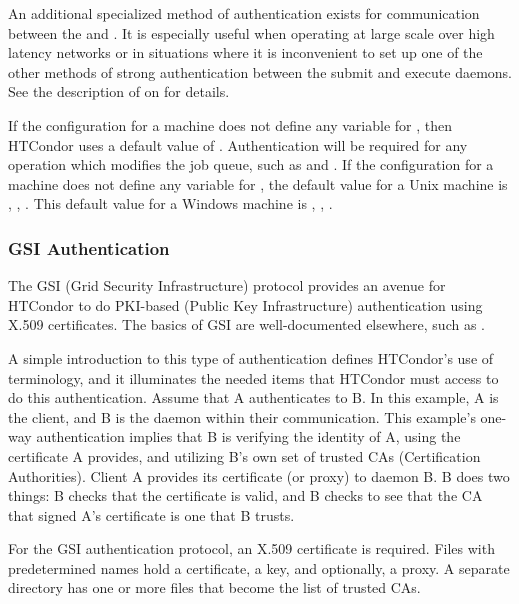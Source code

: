 An additional specialized method of authentication exists for
communication between the  and .  It is
especially useful when operating at large scale over high latency
networks or in situations where it is inconvenient to set up one of
the other methods of strong authentication between the submit and
execute daemons.  See the description of
 on
\pageref{param:SecEnableMatchPasswordAuthentication} for
details.

If the configuration for a machine does not define any variable
for ,
then HTCondor uses a default value of \verb@OPTIONAL@.
Authentication will be required for
any operation which modifies the job queue,
such as  and .
If the configuration for a machine does not define any variable
for ,
the default value for a Unix machine is \verb@FS@, \verb@KERBEROS@,
\verb@GSI@. 
This default value for a Windows machine is
\verb@NTSSPI@, \verb@KERBEROS@, \verb@GSI@. 

\subsubsection{\label{sec:GSI-Authentication}GSI Authentication}
The GSI (Grid Security Infrastructure) protocol provides
an avenue for HTCondor to do
PKI-based (Public Key Infrastructure) authentication using X.509
certificates. 
The basics of GSI are well-documented elsewhere, such as
. 

A simple introduction to this type of authentication
defines HTCondor's use of terminology,
and it illuminates the needed items that HTCondor must access to
do this authentication.
Assume that 
A authenticates to B.
In this example, A is the client, and B is the daemon within
their communication.
This example's one-way authentication implies that B
is verifying the identity of A,
using the certificate A provides,
and utilizing B's own set of trusted CAs (Certification Authorities).
Client A provides its certificate (or proxy) to daemon B.
B does two things:
B checks that the certificate is valid,
and B checks to see that the CA that signed A's certificate
is one that B trusts.

For the GSI authentication protocol,
an X.509 certificate is required.
Files with predetermined names hold a certificate,
a key, and optionally, a proxy.
A separate directory has one or more files that become the list of
trusted CAs.

